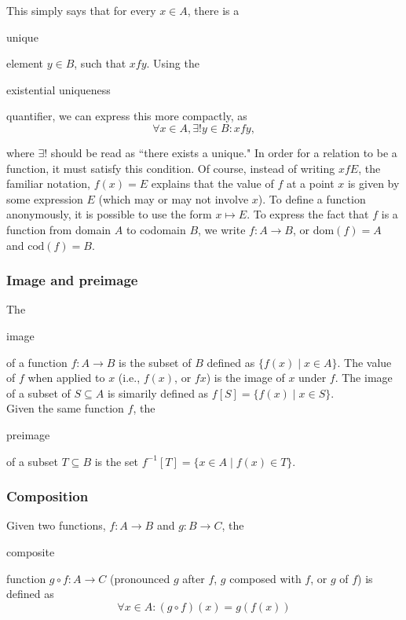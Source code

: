 \documentclass[11pt]{article}
\theoremstyle{plain}
\theoremstyle{definition}
\begin{document}
\noindent This simply says that for every $ x \in A $, there is a \begin{em}unique\end{em} element $ y \in B $, such that $ x f y $. Using the \begin{em}existential uniqueness\end{em} quantifier, we can express this more compactly, as
$$
  \forall x \in A, \exists ! y \in B : x f y,
$$

\noindent where $ \exists ! $ should be read as ``there exists a unique."
In order for a relation to be a function, it must satisfy this condition. 
Of course, instead of writing $ x f E $, the familiar notation, $ f(x) = E $ explains that the value of $ f $ at a point $ x $ is given by some expression $ E $ (which may or may not involve $ x $).
To define a function anonymously, it is possible to use the form $ x \mapsto E $.
To express the fact that $ f $ is a function from domain $ A $ to codomain $ B $, we write $ f : A \to B $, or $ \mathrm{dom}(f) = A $ and $ \mathrm{cod}(f) = B $.

\subsubsection*{Image and preimage}

The \begin{em}image\end{em} of a function $ f : A \to B $ is the subset of $ B $ defined as $ \{ f(x) \mid x \in A \} $. 
The value of $ f $ when applied to $ x $ (i.e., $ f (x) $, or $ f x $) is the image of $ x $ under $ f $.
The image of a subset of $ S \subseteq A $ is simarily defined as $ f[S] = \{ f(x) \mid x \in S \} $. \\

\noindent Given the same function $ f $, the \begin{em}preimage\end{em} of a subset $ T \subseteq B $ is the set $ f^{-1}[T] = \{ x \in A \mid f(x) \in T \} $. 

\begin{center}
  \def\svgwidth{0.85\columnwidth}
  
\end{center}

\subsubsection*{Composition}

\noindent Given two functions, $ f : A \to B $ and $ g : B \to C $, the \begin{em}composite\end{em} function $ g \circ f : A \to C $ (pronounced $ g $ after $ f $, $ g $ composed with $ f $, or $ g $ of $ f $) is defined as
$$
  \forall x \in A : (g \circ f) (x) = g (f(x))
$$
\end{document}
